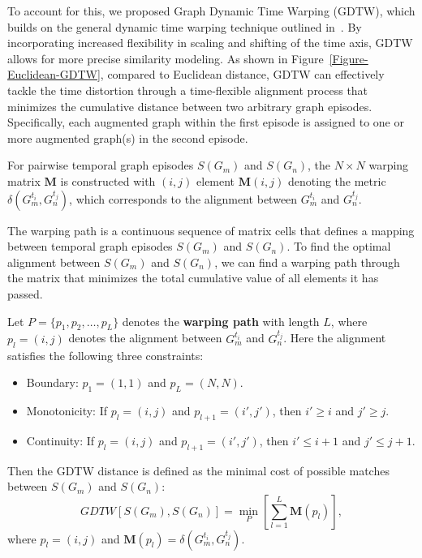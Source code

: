 \documentclass[10pt,journal,compsoc]{IEEEtran}
\begin{document}
To account for this, we proposed Graph Dynamic Time Warping (GDTW), which builds on the general dynamic time warping technique outlined in~\cite{DTW,DTW-2}. By incorporating increased flexibility in scaling and shifting of the time axis, GDTW allows for more precise similarity modeling. As shown in Figure~\ref{Figure-Euclidean-GDTW}, compared to Euclidean distance, GDTW can effectively tackle the time distortion through a time-flexible alignment process that minimizes the cumulative distance between two arbitrary graph episodes. Specifically, each augmented graph within the first episode is assigned to one or more augmented graph(s) in the second episode.


For pairwise temporal graph episodes $S(G_{m})$ and $S(G_{n})$, the $N \times N$ warping matrix $\mathbf{M}$ is constructed with $(i, j)$ element $\mathbf{M}(i, j)$ denoting the metric $\delta(G_{m}^{t_{i}}, G_{n}^{t_{j}})$, which corresponds to the alignment between $G_{m}^{t_{i}}$ and $G_{n}^{t_{j}}$.


The warping path is a continuous sequence of matrix cells that defines a mapping between temporal graph episodes $S(G_{m})$ and $S(G_{n})$. To find the optimal alignment between $S(G_{m})$ and $S(G_{n})$, we can find a warping path through the matrix that minimizes the total cumulative value of all elements it has passed.


Let $P = \{ p_{1}, p_{2}, \ldots, p_{L}\}$ denotes the \textbf{warping path} with length $L$, where $p_{l} = (i, j)$ denotes the alignment between $G_{m}^{t_{i}}$ and $G_{n}^{t_{j}}$.
Here the alignment satisfies the following three constraints:
\begin{itemize}
\item[(1)] Boundary: $p_{1} = (1, 1)$ and $p_{L} = (N, N)$.
\item[(2)] Monotonicity: If $p_{l} = (i, j)$ and $p_{l+1} = (i', j')$, then $i' \geq i$ and $j' \geq j$.
\item[(3)] Continuity: If $p_{l} = (i, j)$ and $p_{l+1} = (i', j')$, then $i' \leq i+1$ and $j' \leq j+1$.
\end{itemize}


Then the GDTW distance is defined as the minimal cost of possible matches between $S(G_{m})$ and $S(G_{n})$:
\begin{equation}\label{GDTW}
  GDTW[S(G_{m}), S(G_{n})] = \min\limits_{P}[\sum_{l = 1}^{L} \mathbf{M}(p_{l})],
\end{equation}
where $p_{l} = (i, j)$ and $\mathbf{M}(p_{l})= \delta(G_{m}^{t_{i}}, G_{n}^{t_{j}})$.
\end{document}
